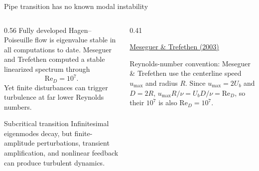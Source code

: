 \documentclass[aspectratio=169,11pt]{beamer}
\newcommand{\Rey}{\mathrm{Re}}
\begin{document}
\begin{frame}{Pipe transition has no known modal instability}
\begin{columns}[T,onlytextwidth]
\begin{column}{0.56\textwidth}
Fully developed Hagen--Poiseuille flow is eigenvalue stable in all computations to date. Meseguer and Trefethen computed a stable linearized spectrum through
\[
  \Rey_D=10^7.
\]
Yet finite disturbances can trigger turbulence at far lower Reynolds numbers.

\begin{block}{Subcritical transition}
Infinitesimal eigenmodes decay, but finite-amplitude perturbations, transient amplification, and nonlinear feedback can produce turbulent dynamics.
\end{block}
\end{column}
\begin{column}{0.41\textwidth}
\centering
{}

\vspace{0.3em}
{\scriptsize \href{https://doi.org/10.1016/S0021-9991(03)00029-9}{Meseguer \& Trefethen (2003)}\par}

\vspace{0.3em}
{\scriptsize\raggedright Reynolds-number convention: Meseguer \& Trefethen use the centerline speed $u_{\max}$ and radius $R$. Since $u_{\max}=2U_b$ and $D=2R$, $u_{\max}R/\nu=U_bD/\nu=\Rey_D$, so their $10^7$ is also $\Rey_D=10^7$.\par}
\end{column}
\end{columns}
\end{frame}
\end{document}
